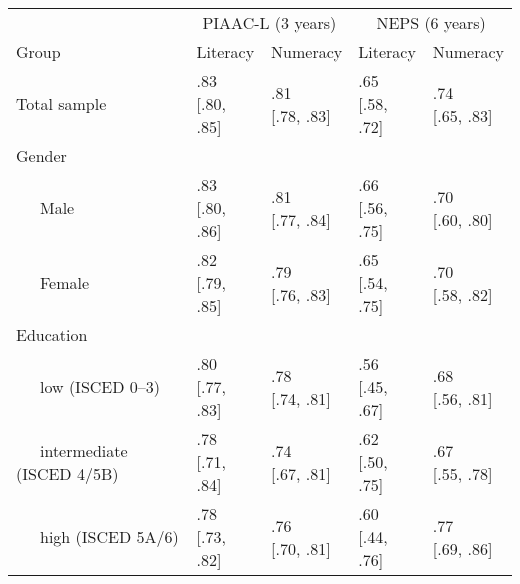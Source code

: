 \documentclass[
  english,
  man]{apa6}
\begin{document}
\begin{table}[tbp]
\begin{center}
\begin{threeparttable}
\begin{tabular}{lllll}
\toprule
 & \multicolumn{2}{c}{PIAAC-L (3 years)} & \multicolumn{2}{c}{NEPS (6 years)} \\
\cmidrule(r){2-3} \cmidrule(r){4-5}
Group & Literacy & Numeracy & Literacy & Numeracy\\
\midrule
Total sample & \makecell[c]{.83 \\ {[}.80, .85{]}} & \makecell[c]{.81 \\ {[}.78, .83{]}} & \makecell[c]{.65 \\  {[}.58, .72{]}} & \makecell[c]{.74 \\ {[}.65, .83{]}}\\
Gender &  &  &  & \\
\ \ \ Male & \makecell[c]{.83 \\ {[}.80, .86{]}} & \makecell[c]{.81 \\ {[}.77, .84{]}} & \makecell[c]{.66 \\  {[}.56, .75{]}} & \makecell[c]{.70 \\ {[}.60, .80{]}}\\
\ \ \ Female & \makecell[c]{.82 \\ {[}.79, .85{]}} & \makecell[c]{.79 \\ {[}.76, .83{]}} & \makecell[c]{.65 \\  {[}.54, .75{]}} & \makecell[c]{.70 \\ {[}.58, .82{]}}\\
Education &  &  &  & \\
\ \ \ low (ISCED 0–3) & \makecell[c]{.80 \\ {[}.77, .83{]}} & \makecell[c]{.78 \\ {[}.74, .81{]}} & \makecell[c]{.56 \\  {[}.45, .67{]}} & \makecell[c]{.68 \\ {[}.56, .81{]}}\\
\ \ \ intermediate (ISCED 4/5B) & \makecell[c]{.78 \\ {[}.71, .84{]}} & \makecell[c]{.74 \\ {[}.67, .81{]}} & \makecell[c]{.62 \\  {[}.50, .75{]}} & \makecell[c]{.67 \\ {[}.55, .78{]}}\\
\ \ \ high (ISCED 5A/6) & \makecell[c]{.78 \\ {[}.73, .82{]}} & \makecell[c]{.76 \\ {[}.70, .81{]}} & \makecell[c]{.60 \\  {[}.44, .76{]}} & \makecell[c]{.77 \\ {[}.69, .86{]}}\\

\end{tabular}
\end{threeparttable}
\end{center}
\end{table}
\end{document}
